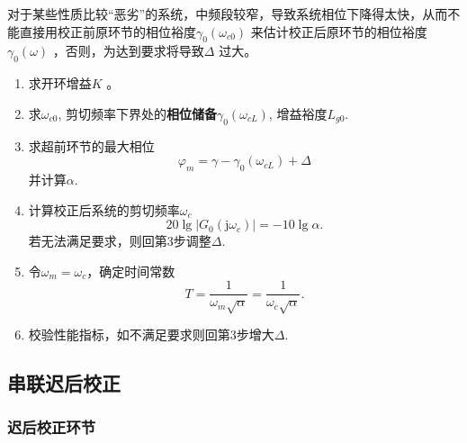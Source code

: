 \documentclass[14pt,a4paper]{article}
\theoremstyle{plain}
\theoremstyle{definition}
\theoremstyle{remark}
\theoremstyle{plain}
\theoremstyle{plain}
\theoremstyle{plain}
\theoremstyle{definition}
\theoremstyle{remark}
\numberwithin{equation}{section}
\begin{document}
					对于某些性质比较``恶劣''的系统，中频段较窄，导致系统相位下降得太快，从而不能直接用校正前原环节的相位裕度$\gamma_0(\omega_{c0})$ 来估计校正后原环节的相位裕度$\gamma_0(\omega)$ ，否则，为达到要求将导致$\Delta$ 过大。
					\begin{enumerate}
						\item 求开环增益$K$ 。 
						\item 求$\omega_{c0}$, 剪切频率下界处的\textbf{相位储备}$\gamma_0(\omega_{cL})$, 增益裕度$L_{g 0}$. 
						\item 求超前环节的最大相位
							\[
								\varphi_m = \gamma - \gamma_0(\omega_{cL})+\Delta 
							\]
							并计算$\alpha$. 
						\item 计算校正后系统的剪切频率$\omega_c$ 
							\[
								20 \lg \left| G_0(\mathrm{j} \omega_c) \right| = - 10\lg \alpha 
							.\]
							若无法满足要求，则回第3步调整$\Delta$. 
						\item 令$\omega_m=\omega_c$，确定时间常数 
							\[
							T = \dfrac{1}{\omega_m \sqrt{\alpha}} = \dfrac{1}{\omega_c \sqrt{\alpha}}
							.\]
						\item 校验性能指标，如不满足要求则回第3步增大$\Delta$. 
					\end{enumerate} 

	
		\subsection{串联迟后校正}%
		\label{sub:串联迟后校正}
		
			\subsubsection{迟后校正环节}%
			\label{ssub:迟后校正环节}
			
\end{document}
